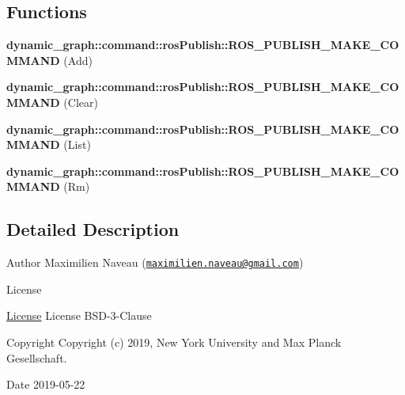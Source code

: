 \subsection*{Functions}
\begin{DoxyCompactItemize}
\item 
{\bfseries dynamic\+\_\+graph\+::command\+::ros\+Publish\+::\+R\+O\+S\+\_\+\+P\+U\+B\+L\+I\+S\+H\+\_\+\+M\+A\+K\+E\+\_\+\+C\+O\+M\+M\+A\+ND} (Add)\hypertarget{ros__publish_8hh_a6edff201bb1965b7e9e54641f6109434}{}\label{ros__publish_8hh_a6edff201bb1965b7e9e54641f6109434}

\item 
{\bfseries dynamic\+\_\+graph\+::command\+::ros\+Publish\+::\+R\+O\+S\+\_\+\+P\+U\+B\+L\+I\+S\+H\+\_\+\+M\+A\+K\+E\+\_\+\+C\+O\+M\+M\+A\+ND} (Clear)\hypertarget{ros__publish_8hh_a384348e4e418cc230ce5aff020e2c179}{}\label{ros__publish_8hh_a384348e4e418cc230ce5aff020e2c179}

\item 
{\bfseries dynamic\+\_\+graph\+::command\+::ros\+Publish\+::\+R\+O\+S\+\_\+\+P\+U\+B\+L\+I\+S\+H\+\_\+\+M\+A\+K\+E\+\_\+\+C\+O\+M\+M\+A\+ND} (List)\hypertarget{ros__publish_8hh_ae4e7c7511bb0cfbb523acf5fb2aac3b8}{}\label{ros__publish_8hh_ae4e7c7511bb0cfbb523acf5fb2aac3b8}

\item 
{\bfseries dynamic\+\_\+graph\+::command\+::ros\+Publish\+::\+R\+O\+S\+\_\+\+P\+U\+B\+L\+I\+S\+H\+\_\+\+M\+A\+K\+E\+\_\+\+C\+O\+M\+M\+A\+ND} (Rm)\hypertarget{ros__publish_8hh_a5ca28cb1740bdb17723412b5ce8d342c}{}\label{ros__publish_8hh_a5ca28cb1740bdb17723412b5ce8d342c}

\end{DoxyCompactItemize}


\subsection{Detailed Description}
\begin{DoxyAuthor}{Author}
Maximilien Naveau (\href{mailto:maximilien.naveau@gmail.com}{\tt maximilien.\+naveau@gmail.\+com}) 
\end{DoxyAuthor}
\begin{DoxyRefDesc}{License}
\item[\hyperlink{license__license000021}{License}]License B\+S\+D-\/3-\/\+Clause \end{DoxyRefDesc}
\begin{DoxyCopyright}{Copyright}
Copyright (c) 2019, New York University and Max Planck Gesellschaft. 
\end{DoxyCopyright}
\begin{DoxyDate}{Date}
2019-\/05-\/22 
\end{DoxyDate}


